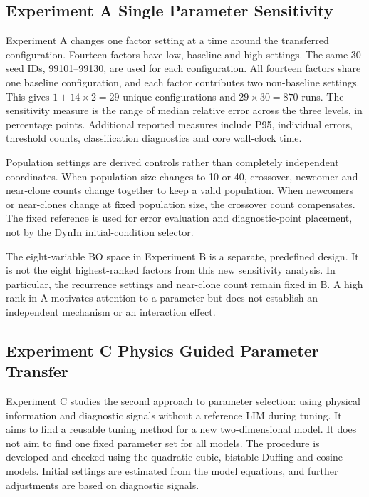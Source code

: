 \subsection{Experiment A Single Parameter Sensitivity}

\begin{revision}
Experiment A changes one factor setting at a time around the transferred configuration. Fourteen factors have low, baseline and high settings. The same 30 seed IDs, 99101--99130, are used for each configuration. All fourteen factors share one baseline configuration, and each factor contributes two non-baseline settings. This gives $1+14\times2=29$ unique configurations and $29\times30=870$ runs. The sensitivity measure is the range of median relative error across the three levels, in percentage points. Additional reported measures include P95, individual errors, threshold counts, classification diagnostics and core wall-clock time.

Population settings are derived controls rather than completely independent coordinates. When population size changes to 10 or 40, crossover, newcomer and near-clone counts change together to keep a valid population. When newcomers or near-clones change at fixed population size, the crossover count compensates. The fixed reference is used for error evaluation and diagnostic-point placement, not by the DynIn initial-condition selector.

The eight-variable BO space in Experiment B is a separate, predefined design. It is not the eight highest-ranked factors from this new sensitivity analysis. In particular, the recurrence settings and near-clone count remain fixed in B. A high rank in A motivates attention to a parameter but does not establish an independent mechanism or an interaction effect.
\end{revision}



\subsection{Experiment C Physics Guided Parameter Transfer}
\label{sec:c-method}

Experiment C studies the second approach to parameter selection: using physical information and diagnostic signals without a reference LIM during tuning. It aims to find a reusable tuning method for a new two-dimensional model. It does not aim to find one fixed parameter set for all models. The procedure is developed and checked using the quadratic-cubic, bistable Duffing and cosine models. Initial settings are estimated from the model equations, and further adjustments are based on diagnostic signals.

